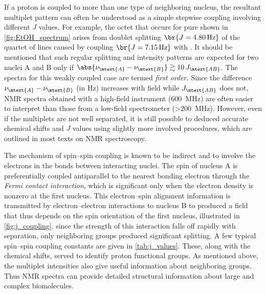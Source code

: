 If a proton is coupled to more than one type of neighboring nucleus, the resultant multiplet pattern can often be understood as a simple stepwise coupling involving different \( J \) values.
For example, the  octet that occurs for pure  shown in \cref{fig:EtOH_spectrum} arises from  doublet splitting \( \br{J = \qty{4.80}{\Hz}} \) of the quartet of lines caused by coupling \( \br{J = \qty{7.15}{\Hz}} \) with . 
It should be mentioned that such regular splitting and intensity patterns are expected for two nuclei A and B only if \( \abs{\nu_\mtext{A} - \nu_\mtext{B}} \gtrsim 10\,J_\mtext{AB} \). 
The spectra for this weakly coupled case are termed \emph{first order.}
Since the difference \( \nu_\mtext{A} - \nu_\mtext{B} \) (in \unit{\Hz}) increases with field while \( J_\mtext{AB} \) does not, NMR spectra obtained with a high-field instrument (\qty{600}{\MHz}) are often easier to interpret than those from a low-field spectrometer (\qty{>200}{\MHz}). 
However, even if the multiplets are not well separated, it is still possible to deduced accurate chemical shifts and \( J \) values using slightly more involved procedures, which are outlined in most texts on NMR spectroscopy.\autocite{davis1965advanced,pople1959nmr,silverstein2005spec,burdett1964a,rogers1956a}

The mechanism of spin--spin coupling is known to be indirect and to involve the electrons in the bonds between interacting nuclei. 
The spin of nucleus A is preferentially coupled antiparallel to the nearest bonding electron through the \emph{Fermi contact interaction}, which is significant only when the electron density is nonzero at the first nucleus.
This electron--spin alignment information is transmitted by electron--electron interactions to nucleus B to produced a field that thus depends on the spin orientation of the first nucleus, illustrated in \cref{fig:j_coupling}. 
since the strength of this interaction falls off rapidly with separation, only neighboring groups produced significant splitting. 
A few typical spin--spin coupling constants are given in \cref{tab:j_values}. 
These, along with the chemical shifts, served to identify proton functional groups. 
As mentioned above, the multiplet intensities also give useful information about neighboring groups. 
Thus NMR spectra can provide detailed structural information about large and complex biomolecules. 

